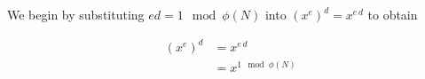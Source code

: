 \documentclass[../CryptoHW3.tex]{subfiles}
\begin{document}
\begin{flushleft}



  We begin by substituting $e d = 1 \mod \phi \left( N \right)$ into $\left( x^e \right)^d = x^{e \, d}$ to obtain %

\begin{align*}
   \left( x^e \right)^d &= x^{e \, d} \\
   &= x^{1 \mod \phi \left( N \right)}
\end{align*}




\end{flushleft}
\end{document}
